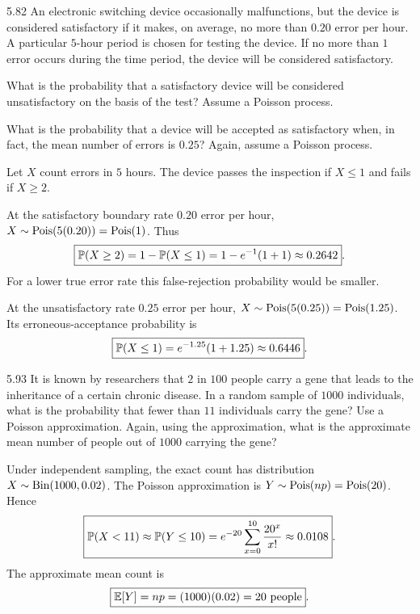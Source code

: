 \documentclass[11pt,oneside]{article}
\begin{document}
\begin{exercise}{5.82}
An electronic switching device occasionally malfunctions, but the device is considered satisfactory if it makes, on average, no more than $0.20$ error per hour. A particular $5$-hour period is chosen for testing the device. If no more than $1$ error occurs during the time period, the device will be considered satisfactory.
\begin{exercisesubparts}
\item What is the probability that a satisfactory device will be considered unsatisfactory on the basis of the test? Assume a Poisson process.
\item What is the probability that a device will be accepted as satisfactory when, in fact, the mean number of errors is $0.25$? Again, assume a Poisson process.
\end{exercisesubparts}
\end{exercise}
\begin{solution}
Let $X$ count errors in $5$ hours. The device passes the inspection if $X\le1$ and fails if $X\ge2$.
\begin{exercisesubparts}
\item At the satisfactory boundary rate $0.20$ error per hour, $X\sim\operatorname{Pois}(5(0.20))=\operatorname{Pois}(1)$. Thus
\[
\boxed{\mathbb{P}(X\ge2)=1-\mathbb{P}(X\le1)=1-e^{-1}(1+1)\approx0.2642}.
\]
For a lower true error rate this false-rejection probability would be smaller.
\item At the unsatisfactory rate $0.25$ error per hour, $X\sim\operatorname{Pois}(5(0.25))=\operatorname{Pois}(1.25)$. Its erroneous-acceptance probability is
\[
\boxed{\mathbb{P}(X\le1)=e^{-1.25}(1+1.25)\approx0.6446}.
\]
\end{exercisesubparts}
\end{solution}

\begin{exercise}{5.93}
It is known by researchers that $2$ in $100$ people carry a gene that leads to the inheritance of a certain chronic disease. In a random sample of $1000$ individuals, what is the probability that fewer than $11$ individuals carry the gene? Use a Poisson approximation. Again, using the approximation, what is the approximate mean number of people out of $1000$ carrying the gene?
\end{exercise}
\begin{solution}
Under independent sampling, the exact count has distribution $X\sim\operatorname{Bin}(1000,0.02)$. The Poisson approximation is $Y\sim\operatorname{Pois}(np)=\operatorname{Pois}(20)$. Hence
\[
\boxed{\mathbb{P}(X<11)\approx\mathbb{P}(Y\le10)
=e^{-20}\sum_{x=0}^{10}\frac{20^x}{x!}\approx0.0108}.
\]
The approximate mean count is
\[
\boxed{\mathbb{E}[Y]=np=(1000)(0.02)=20\text{ people}}.
\]
\end{solution}
\end{document}

